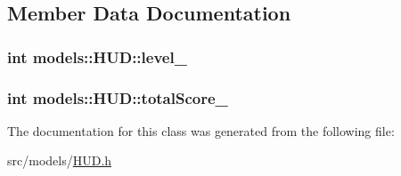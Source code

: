 \subsection{\-Member \-Data \-Documentation}
\hypertarget{classmodels_1_1HUD_ad60199df8348afb4be0fba2a252674d8}{
\subsubsection[{level\-\_\-}]{\setlength{\rightskip}{0pt plus 5cm}int {\bf models\-::\-H\-U\-D\-::level\-\_\-}}}\label{d6/dbb/classmodels_1_1HUD_ad60199df8348afb4be0fba2a252674d8}
\hypertarget{classmodels_1_1HUD_ad01ce2899fd56af3dcc73d94454f676e}{
\subsubsection[{total\-Score\-\_\-}]{\setlength{\rightskip}{0pt plus 5cm}int {\bf models\-::\-H\-U\-D\-::total\-Score\-\_\-}}}\label{d6/dbb/classmodels_1_1HUD_ad01ce2899fd56af3dcc73d94454f676e}


\-The documentation for this class was generated from the following file\-:\begin{DoxyCompactItemize}
\item 
src/models/\hyperlink{HUD_8h}{\-H\-U\-D.\-h}\end{DoxyCompactItemize}

